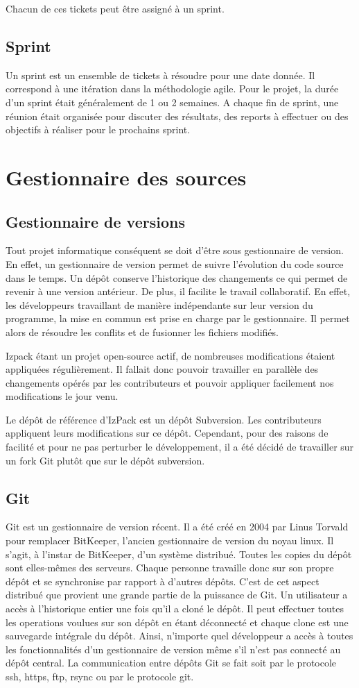 Chacun de ces tickets peut être assigné à un sprint.
\subsection{Sprint}
Un sprint est un ensemble de tickets à résoudre pour une date donnée.
Il correspond à une itération dans la méthodologie agile.
Pour le projet, la durée d'un sprint était généralement de 1 ou 2 semaines.
A chaque fin de sprint, une réunion était organisée pour discuter des résultats, des reports à effectuer ou des objectifs à réaliser pour le prochains sprint.
\section{Gestionnaire des sources}
\subsection{Gestionnaire de versions}
Tout projet informatique conséquent se doit d'être sous gestionnaire de version.
En effet, un gestionnaire de version permet de suivre l'évolution du code source dans le temps.
Un dépôt conserve l'historique des changements ce qui permet de revenir à une version antérieur.
De plus, il facilite le travail collaboratif.
En effet, les développeurs travaillant de manière indépendante sur leur version du programme, la mise en commun est prise en charge par le gestionnaire.
Il permet alors de résoudre les conflits et de fusionner les fichiers modifiés.

Izpack étant un projet open-source actif, de nombreuses modifications étaient appliquées régulièrement.
Il fallait donc pouvoir travailler en parallèle des changements opérés par les contributeurs et pouvoir appliquer facilement nos modifications le jour venu.

Le dépôt de référence d'IzPack est un dépôt Subversion.
Les contributeurs appliquent leurs modifications sur ce dépôt.
Cependant, pour des raisons de facilité et pour ne pas perturber le développement, il a été décidé de travailler sur un fork Git plutôt que sur le dépôt subversion.
\subsection{Git}
Git est un gestionnaire de version récent. Il a été créé en 2004 par Linus Torvald pour remplacer BitKeeper, l'ancien gestionnaire de version du noyau linux.
Il s'agit, à l'instar de BitKeeper, d'un système distribué.
Toutes les copies du dépôt sont elles-mêmes des serveurs.
Chaque personne travaille donc sur son propre dépôt et se synchronise par rapport à d'autres dépôts.
C'est de cet aspect distribué que provient une grande partie de la puissance de Git.
Un utilisateur a accès à l'historique entier une fois qu'il a cloné le dépôt.
Il peut effectuer toutes les operations voulues sur son dépôt en étant déconnecté et chaque clone est une sauvegarde intégrale du dépôt.
Ainsi, n'importe quel développeur a accès à toutes les fonctionnalités d'un gestionnaire de version même s'il n'est pas connecté au dépôt central.
La communication entre dépôts Git se fait soit par le protocole ssh, https, ftp, rsync ou par le protocole git.

